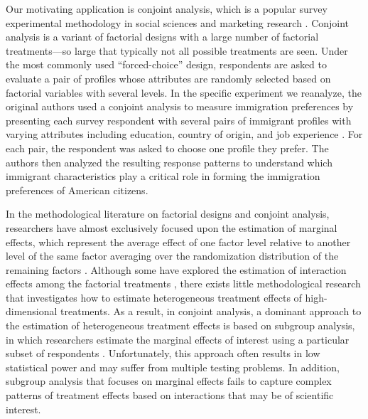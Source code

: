Our motivating application is conjoint analysis, which is a popular
survey experimental methodology in social sciences and marketing
research \citep[e.g.,][]{hainmueller2014causal,rao:14}.  Conjoint
analysis is a variant of factorial designs \citep{DasPilRub15} with a
large number of factorial treatments---so large that typically not all
possible treatments are seen.  Under the most commonly used
``forced-choice'' design, respondents are asked to evaluate a pair of
profiles whose attributes are randomly selected based on factorial
variables with several levels.  In the specific experiment we
reanalyze, the original authors used a conjoint analysis to measure
immigration preferences by presenting each survey respondent with
several pairs of immigrant profiles with varying attributes including
education, country of origin, and job experience
\citep{hainmueller2015hidden}.  For each pair, the respondent was
asked to choose one profile they prefer.  The authors then analyzed
the resulting response patterns to understand which immigrant
characteristics play a critical role in forming the immigration
preferences of American citizens.

In the methodological literature on factorial designs and conjoint
analysis, researchers have almost exclusively focused upon the
estimation of marginal effects, which represent the average effect of
one factor level relative to another level of the same factor
averaging over the randomization distribution of the remaining factors
\citep{hainmueller2014causal, DasPilRub15}.  Although some have
explored the estimation of interaction effects among the factorial
treatments
\citep[e.g.,][]{DasPilRub15,egam:imai:19,de2022improving}, there
exists little methodological research that investigates how to
estimate heterogeneous treatment effects of high-dimensional
treatments.  As a result, in conjoint analysis, a dominant approach to
the estimation of heterogeneous treatment effects is based on subgroup
analysis, in which researchers estimate the marginal effects of
interest using a particular subset of respondents
\citep[e.g.,][]{hainmueller2015hidden,newman2019economic}.
Unfortunately, this approach often results in low statistical power
and may suffer from multiple testing problems.  In addition, subgroup
analysis that focuses on marginal effects fails to capture complex
patterns of treatment effects based on interactions that may be of
scientific interest.


